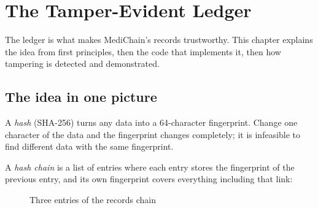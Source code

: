 \chapter{The Tamper-Evident Ledger}\label{ch:ledger}

The ledger is what makes MediChain's records trustworthy. This chapter explains
the idea from first principles, then the code that implements it, then how
tampering is detected and demonstrated.

\section{The idea in one picture}

A \emph{hash} (SHA-256) turns any data into a 64-character fingerprint. Change
one character of the data and the fingerprint changes completely; it is
infeasible to find different data with the same fingerprint.

A \emph{hash chain} is a list of entries where each entry stores the fingerprint
of the previous entry, and its own fingerprint covers everything including that
link:

\begin{figure}[H]
\centering
{}
\caption{Three entries of the records chain}\label{fig:chain}
\end{figure}

